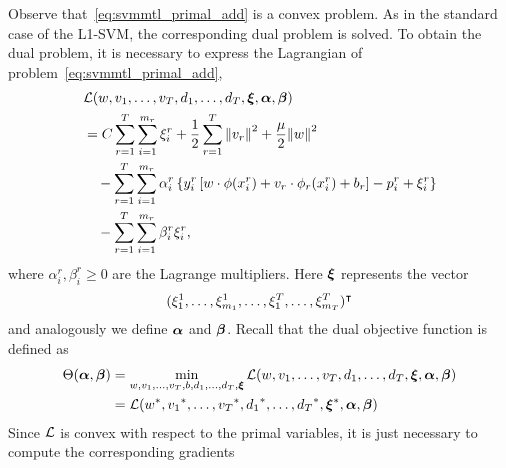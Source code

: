 Observe that~\eqref{eq:svmmtl_primal_add} is a convex problem. As in the standard case of the L1-SVM, the corresponding dual problem is solved. To obtain the dual problem, it is necessary to express the Lagrangian of problem~\eqref{eq:svmmtl_primal_add},
\begin{equation}\label{eq:svmmtl_lagrangian_add}
    \begin{aligned}
        & \lagr({w}, {v}_1, \ldots, {v}_\ntasks, d_1, \ldots, d_\ntasks, \fv{\xi}, \fv{\alpha}, \fv{\beta}) \\
        &= C \sum_{r= 1}^T \sum_{i=1}^{m_r} {\xi_{i}^r} + \frac{1}{2} \sum_{r= 1}^T{\norm{{v}_r}^2} + \frac{\mu}{2} {\norm{{w}}}^2 \\
        &\quad -  \sum_{r= 1}^T \sum_{i=1}^{m_r} \alpha_i^r \left\lbrace y_{i}^r \left[ {w} \cdot \phi(x_{i}^r) + {v}_r \cdot \phi_r(x_{i}^r) + b_r \right] - p_{i}^r + \xi_{i}^r  \right\rbrace \\
        &\quad -  \sum_{r= 1}^T \sum_{i=1}^{m_r} \beta_i^r \xi_i^r ,
    \end{aligned}
\end{equation}
where $\alpha_i^r, \beta_i^r \geq 0$ are the Lagrange multipliers. Here $\bm{\xi}$ represents the vector $$(\xi_1^1, \ldots, \xi_{m_1}^1, \ldots, \xi_1^T, \ldots, \xi_{m_T}^T)^\intercal$$ and analogously we define $\bm{\alpha}$ and $\bm{\beta}$.
Recall that the dual objective function is defined as 
\begin{equation}\nonumber
    \begin{aligned}
         \Theta(\bm{\alpha}, \bm{\beta}) &=  \min_{{w}, {v}_1, \ldots, {v}_T, b, d_1, \ldots, d_T, \bm{\xi}} \mathcal{L}({w}, {v}_1, \ldots, {v}_T, d_1, \ldots, d_T, \bm{\xi}, \bm{\alpha}, \bm{\beta}) \\
         &= \mathcal{L}({{w}}^*, {{v}_1}^*, \ldots, {{v}_T}^*, {d_1}^*, \ldots, {d_T}^*, {\bm{\xi}}^*, \bm{\alpha}, \bm{\beta})
    \end{aligned}    
\end{equation}
Since $\mathcal{L}$ is convex with respect to the primal variables, it is just necessary to compute the corresponding gradients
